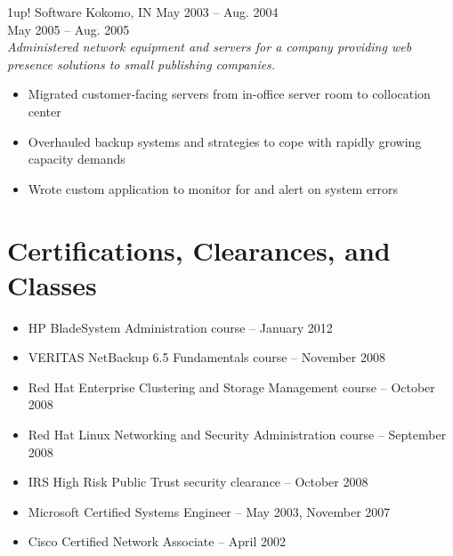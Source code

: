 \documentclass[9pt]{extarticle} %
\begin{document}
\bigskip


\begin{minipage}[c]{\textwidth}

	\begin{indented}
		1up! Software \tab Kokomo, IN \tab May 2003 -- Aug. 2004\\
		\tab \tab May 2005 -- Aug. 2005\\
		\textit{Administered network equipment and servers for a company providing web presence solutions to small publishing companies.}
		\begin{itemize}
			\item Migrated customer-facing servers from in-office server room to collocation center
			\item Overhauled backup systems and strategies to cope with rapidly growing capacity demands
			\item Wrote custom application to monitor for and alert on system errors
		\end{itemize}
	\end{indented}
\end{minipage}


\section{Certifications, Clearances, and Classes}

\begin{indented}
	\begin{itemize}
		\item HP BladeSystem Administration course -- January 2012
		\item VERITAS NetBackup 6.5 Fundamentals course -- November 2008
		\item Red Hat Enterprise Clustering and Storage Management course -- October 2008
		\item Red Hat Linux Networking and Security Administration course -- September 2008
		\item IRS High Risk Public Trust security clearance -- October 2008
		\item Microsoft Certified Systems Engineer -- May 2003, November 2007
		\item Cisco Certified Network Associate -- April 2002
	\end{itemize}
\end{indented}
\end{document}

